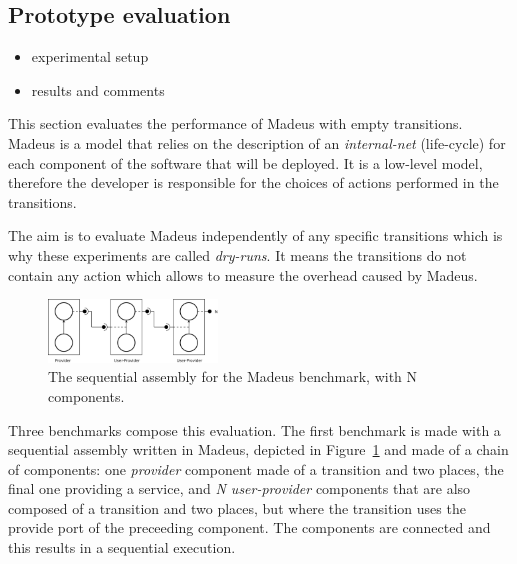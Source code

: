 
\subsection{Prototype evaluation}

\begin{itemize}
\item experimental setup
\item results and comments
\end{itemize}
This section evaluates the performance of Madeus with empty transitions.
Madeus is a model that relies on the description of an \emph{internal-net} (life-cycle) for each component of the software that will be deployed. It is a low-level model, therefore the developer is responsible for the choices of actions performed in the transitions.

The aim is to evaluate Madeus independently of any specific transitions which is why these experiments are called \emph{dry-runs}. It means the transitions do not contain any action which allows to measure the overhead caused by Madeus.


\begin{figure}[h]
  \begin{center}
    \includegraphics[width=0.4\textwidth]{./images/seq.pdf}
    \caption{The sequential assembly for the Madeus benchmark, with N components.}
    \label{fig:seq}
  \end{center}
\end{figure}

Three benchmarks compose this evaluation. The first benchmark is made with a sequential assembly written in Madeus, depicted in Figure~\ref{fig:seq}
and made of a chain of components: one \emph{provider} component made of a transition and two places, the final one providing a service, and \emph{N user-provider} components that are also composed of a transition and two places, but where the transition uses the provide port of the preceeding component. The components are connected and this results in a sequential execution.

